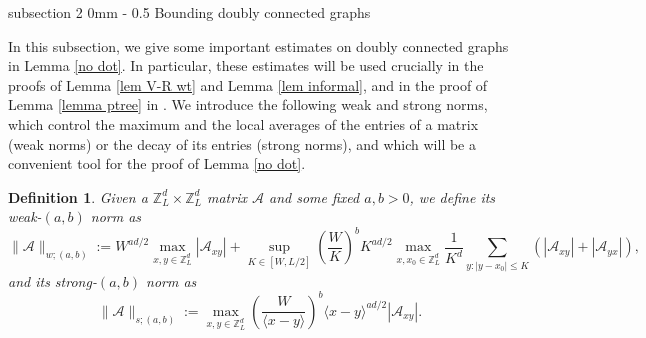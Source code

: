 \documentclass{article}
\makeatletter
\newcommand{\1}{\mathds{1}}
\numberwithin{equation}{section}
\newcommand{\be}{\begin{equation}}
\newcommand{\ee}{\end{equation}}
\renewcommand{\cal}{\mathcal}
\renewcommand{\leq}{\leqslant}
\renewcommand{\le}{\leq}
\newcommand{\Z}{\mathbb{Z}}
\theoremstyle{plain} %
\newtheorem{definition}[theorem]{Definition}
\theoremstyle{remark}
\newcommand{\cor}{\color{red}}
\renewcommand{\section}{\@startsection
{section}%
{1}%
{0mm}%
{-2\baselineskip}%
{2\baselineskip}%
{\normalfont\large\scshape\centering}} %
\renewcommand{\subsection}{\@startsection
{subsection}%
{2}%
{0mm}%
{-\baselineskip}%
{0.5\baselineskip}%
{\normalfont\bf\itshape}} %
\newcommand{\hty}[1]{{\cor (ht: #1) }}
\makeatother
\begin{document}


\subsection{Bounding doubly connected graphs}\label{sec bound double}



In this subsection, we give some important estimates on doubly connected graphs in Lemma \ref{no dot}. In particular, these estimates will be used crucially in the proofs of Lemma \ref{lem V-R wt} and Lemma \ref{lem informal}, and in the proof of Lemma \ref{lemma ptree} in \cite{PartII_high}. We introduce the following weak and strong norms, which control the maximum and the local averages of the entries of a matrix (weak norms) or the decay of its entries (strong norms), and which will be a convenient tool for the proof of Lemma \ref{no dot}. %

\begin{definition}\label{Def PseudoG} 
Given a $\Z_L^d\times \Z_L^d$ matrix $\cal A$ and some fixed $a,b>0$, we define its weak-$(a,b)$ norm as
$$\|\cal A\|_{w;(a,b)}:= W^{a d/2}\max_{x,y\in \Z_L^d} \left|\cal A_{xy}\right| + \sup_{ K \in [W, L/2]} \left( \frac{W}{K}\right)^b K^{ad/2} \max_{x, x_0\in \Z_L^d} \frac1{K^d}\sum_{y:| y - x_0 |\le K} \left(\left|\cal A_{xy}\right|+\left| \cal A_{yx}\right| \right),$$
and its strong-$(a,b)$ norm as
$$\|\cal A\|_{s;(a,b)}:= \max_{x,y\in \Z_L^d} \left( \frac{W}{\langle x-y\rangle}\right)^b \langle x-y\rangle^{ad/2} \left|\cal A_{xy}\right|.$$
\end{definition}

%
%
%
%
%
\end{document}

